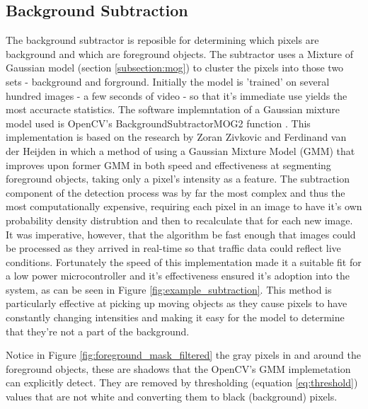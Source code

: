 \subsection{Background Subtraction}
\label{subsection:training}
The background subtractor is reposible for determining which pixels are background and which are foreground objects. The subtractor uses a Mixture of Gaussian model (section \ref{subsection:mog}) to cluster the pixels into those two sets - background and forground. Initially the model is 'trained' on several hundred images - a few seconds of video - so that it's immediate use yields the most accuracte statistics. The software implemntation of a Gaussian mixture model used is OpenCV's BackgroundSubtractorMOG2 function \cite{opencv_mog2}. This implementation is based on the research by Zoran Zivkovic and Ferdinand van der Heijden \cite{zivkovic_pattern_recognition} \cite{zivkovic_heijden_pattern_recognition_letters} in which a method of using a Gaussian Mixture Model (GMM) that improves upon former GMM in both speed and effectiveness at segmenting foreground objects, taking only a pixel's intensity as a feature. The subtraction component of the detection process was by far the most complex and thus the most computationally expensive, requiring each pixel in an image to have it's own probability density distrubtion and then to recalculate that for each new image. It was imperative, however, that the algorithm be fast enough that images could be processed as they arrived in real-time so that traffic data could reflect live conditions. Fortunately the speed of this implementation made it a suitable fit for a low power microcontroller and it's effectiveness ensured it's adoption into the system, as can be seen in Figure \ref{fig:example_subtraction}. This method is particularly effective at picking up moving objects as they cause pixels to have constantly changing intensities and making it easy for the model to determine that they're not a part of the background. 

Notice in Figure \ref{fig:foreground_mask_filtered} the gray pixels in and around the foreground objects, these are shadows that the OpenCV's GMM implemetation can explicitly detect. They are removed by thresholding (equation \ref{eq:threshold}) values that are not white and converting them to black (background) pixels.
